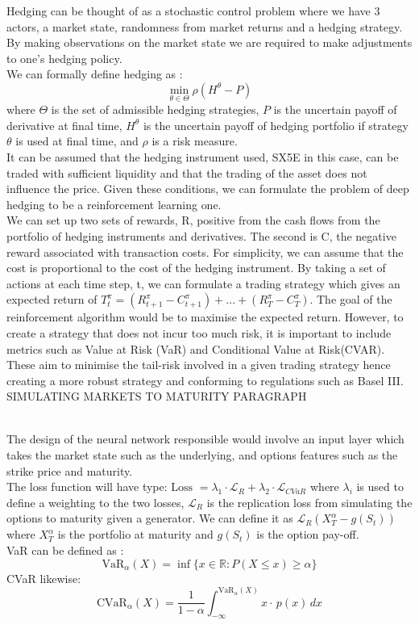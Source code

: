 \documentclass[12pt]{article}
\numberwithin{equation}{section}
\begin{document}
Hedging can be thought of as a stochastic control problem where we have 3 actors, 
a market state, randomness from market returns and a hedging strategy. By making 
observations on the market state we are required to make adjustments to one's
hedging policy. 
\\
We can formally define hedging as :
$$\min_{\theta \in \Theta} \rho (H^\theta - P)$$
where $\Theta$ is the set of admissible hedging strategies, $P$ is the uncertain 
payoff of derivative at final time, $H^\theta$ is the uncertain payoff of hedging 
portfolio if strategy $\theta$ is used at final time, and $\rho$ is a risk measure.
\\
It can be assumed that the hedging instrument used, SX5E in this case, can be 
traded with sufficient liquidity and that the trading of the asset does not 
influence the price. Given these conditions, we can formulate the problem of deep 
hedging to be a reinforcement learning one. 
\\
We can set up two sets of rewards, R, positive from the cash flows from the 
portfolio of hedging instruments and derivatives. The second is C, the negative 
reward associated with transaction costs. For simplicity, we can assume that the 
cost is proportional to the cost of the hedging instrument. By taking a set of 
actions at each time step, t, we can formulate a trading strategy which gives an 
expected return of
$T^\pi_t = (R^\pi_{t+1} - C^\pi_{t+1} )+ ... +(R^\pi_T - C^\pi_T)$.
The goal of the reinforcement algorithm would be to maximise the expected return. 
However, to create a strategy that does not incur too much risk, it is important 
to include metrics such as Value at Risk (VaR) and Conditional Value at Risk(CVAR).
These aim to minimise the tail-risk involved in a given trading strategy hence 
creating a more robust strategy and conforming to regulations such as Basel III.
\cite{The New International Regulation of Market Risk}
\\

SIMULATING MARKETS TO MATURITY PARAGRAPH

\\
The design of the neural network responsible would involve an input layer which
takes the market state such as the underlying, and options features such as the 
strike price and maturity.\\
The loss function will have
type: $\text{Loss }=\lambda_1\cdot\mathcal{L}_R + \lambda_2 \cdot \mathcal{L}_{CVaR}$
where $\lambda_i$ is used to define a weighting to the two losses, $\mathcal{L}_R$ 
is the replication loss from simulating the options to maturity given a generator. 
We can define it as $\mathcal{L}_R(X^\alpha_T-g(S_t))$ where $X^\alpha_T$ is the 
portfolio at maturity and $g(S_t)$ is the option pay-off.\\
VaR can be defined as :
\begin{equation}
\text{VaR}_{\alpha}(X) = \inf \{x \in \mathbb{R} : P(X \leq x) \geq \alpha \}
\end{equation}
CVaR likewise: 
\begin{equation}
\text{CVaR}_{\alpha}(X) = \frac{1}{1 - \alpha} \int_{-\infty}^{\text{VaR}_{\alpha}(X)} x \cdot\, p(x) \, dx
\end{equation}
\end{document}
